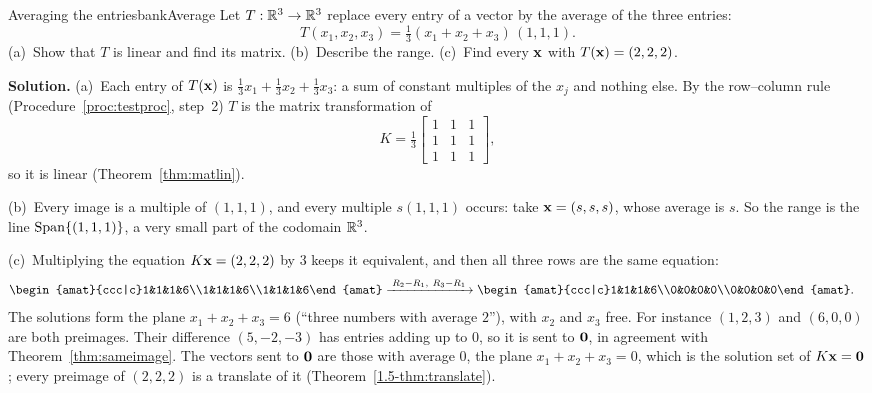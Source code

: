 \documentclass[11pt]{article}
\begin{document}
\begin{exmp}{Averaging the entries}{bankAverage}
Let $T:\mathbb{R}^3\to\mathbb{R}^3$ replace every entry of a vector by the average of the three entries:
\[
T(x_1,x_2,x_3)=\tfrac13(x_1+x_2+x_3)\,(1,1,1).
\]
(a)~Show that $T$ is linear and find its matrix. (b)~Describe the range. (c)~Find every $\mathbf{x}$ with $T(\mathbf{x})=(2,2,2)$.

\textbf{Solution.} (a)~Each entry of $T(\mathbf{x})$ is $\tfrac13x_1+\tfrac13x_2+\tfrac13x_3$: a sum of constant multiples of the $x_j$ and nothing else. By the row--column rule (Procedure~\ref{proc:testproc}, step~2) $T$ is the matrix transformation of
\[
K=\tfrac13\begin{bmatrix}1&1&1\\1&1&1\\1&1&1\end{bmatrix},
\]
so it is linear (Theorem~\ref{thm:matlin}).

(b)~Every image is a multiple of $(1,1,1)$, and every multiple $s(1,1,1)$ occurs: take $\mathbf{x}=(s,s,s)$, whose average is $s$. So the range is the line $\operatorname{Span}\{(1,1,1)\}$, a very small part of the codomain $\mathbb{R}^3$.

(c)~Multiplying the equation $K\mathbf{x}=(2,2,2)$ by $3$ keeps it equivalent, and then all three rows are the same equation:
\begin{align*}
\begin{amat}{ccc|c}1&1&1&6\\1&1&1&6\\1&1&1&6\end{amat}
&\rops{R_2-R_1,\ R_3-R_1}
\begin{amat}{ccc|c}1&1&1&6\\0&0&0&0\\0&0&0&0\end{amat}.
\end{align*}
The solutions form the plane $x_1+x_2+x_3=6$ (``three numbers with average $2$''), with $x_2$ and $x_3$ free. For instance $(1,2,3)$ and $(6,0,0)$ are both preimages. Their difference $(5,-2,-3)$ has entries adding up to $0$, so it is sent to $\mathbf{0}$, in agreement with Theorem~\ref{thm:sameimage}. The vectors sent to $\mathbf{0}$ are those with average $0$, the plane $x_1+x_2+x_3=0$, which is the solution set of $K\mathbf{x}=\mathbf{0}$; every preimage of $(2,2,2)$ is a translate of it (Theorem~\ref{1.5-thm:translate}).
\end{exmp}
\end{document}
